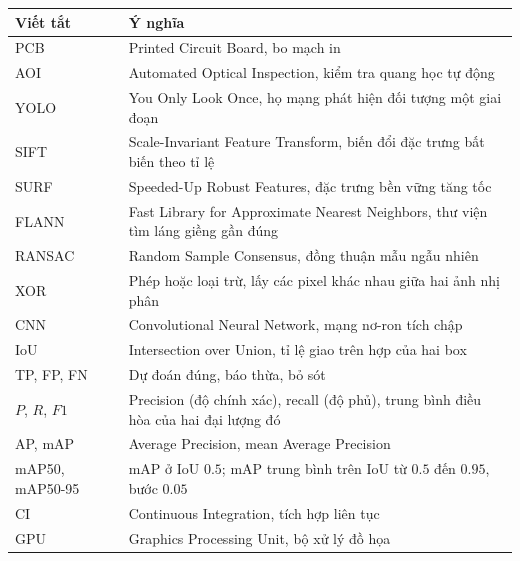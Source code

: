 \documentclass[11pt,a4paper]{article}
\begin{document}
\begin{center}
\small
\begin{tabular}{l|p{12cm}}
\toprule
\textbf{Viết tắt} & \textbf{Ý nghĩa} \\ \midrule
PCB & Printed Circuit Board, bo mạch in \\
AOI & Automated Optical Inspection, kiểm tra quang học tự động \\
YOLO & You Only Look Once, họ mạng phát hiện đối tượng một giai đoạn \\
SIFT & Scale-Invariant Feature Transform, biến đổi đặc trưng bất biến theo tỉ lệ \\
SURF & Speeded-Up Robust Features, đặc trưng bền vững tăng tốc \\
FLANN & Fast Library for Approximate Nearest Neighbors, thư viện tìm láng giềng gần đúng \\
RANSAC & Random Sample Consensus, đồng thuận mẫu ngẫu nhiên \\
XOR & Phép hoặc loại trừ, lấy các pixel khác nhau giữa hai ảnh nhị phân \\
CNN & Convolutional Neural Network, mạng nơ-ron tích chập \\
IoU & Intersection over Union, tỉ lệ giao trên hợp của hai box \\
TP, FP, FN & Dự đoán đúng, báo thừa, bỏ sót \\
$P$, $R$, $F1$ & Precision (độ chính xác), recall (độ phủ), trung bình điều hòa của hai đại lượng đó \\
AP, mAP & Average Precision, mean Average Precision \\
mAP50, mAP50-95 & mAP ở IoU $0.5$; mAP trung bình trên IoU từ $0.5$ đến $0.95$, bước $0.05$ \\
CI & Continuous Integration, tích hợp liên tục \\
GPU & Graphics Processing Unit, bộ xử lý đồ họa \\ \bottomrule
\end{tabular}
\end{center}

\clearpage
\tableofcontents
\clearpage
{}
\listoffigures
\clearpage
{}
\listoftables
\bigskip\bigskip
{}
{\vspace{-4pt}%
 \noindent{\color{blue!50!black}\rule{\textwidth}{1.2pt}}\par}
\vspace{4pt}
\makeatletter{}\makeatother
\clearpage
{}
\end{document}
